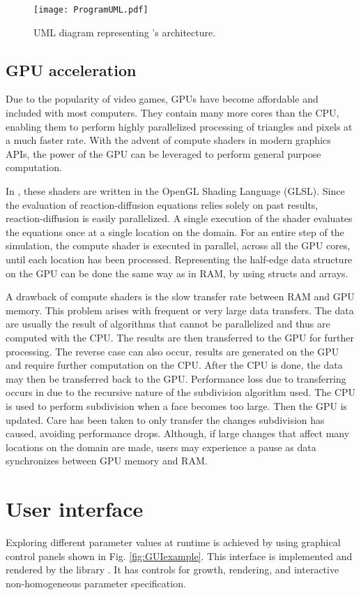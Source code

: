 \begin{figure}[H]
	\centering
	\texttt{[image: ProgramUML.pdf]}
	\caption{UML diagram representing \ProgramName{}'s architecture.}
	\label{fig:umlDiagram}
\end{figure}

\subsection{GPU acceleration}
Due to the popularity of video games, GPUs have become affordable and included with most computers. They contain many more cores than the CPU, enabling them to perform highly parallelized processing of triangles and pixels at a much faster rate. With the advent of compute shaders in modern graphics APIs, the power of the GPU can be leveraged to perform general purpose computation. 

In \ProgramName{}, these shaders are written in the OpenGL Shading Language (GLSL). Since the evaluation of reaction-diffusion equations relies solely on past results, reaction-diffusion is easily parallelized. A single execution of the shader evaluates the equations once at a single location on the domain. For an entire step of the simulation, the compute shader is executed in parallel, across all the GPU cores, until each location has been processed. Representing the half-edge data structure on the GPU can be done the same way as in RAM, by using structs and arrays.

A drawback of compute shaders is the slow transfer rate between RAM and GPU memory. This problem arises with frequent or very large data transfers. The data are usually the result of algorithms that cannot be parallelized and thus are computed with the CPU. The results are then transferred to the GPU for further processing. The reverse case can also occur, results are generated on the GPU and require further computation on the CPU. After the CPU is done, the data may then be transferred back to the GPU. Performance loss due to transferring occurs in \ProgramName{} due to the recursive nature of the subdivision algorithm used. The CPU is used to perform subdivision when a face becomes too large. Then the GPU is updated. Care has been taken to only transfer the changes subdivision has caused, avoiding performance drops. Although, if large changes that affect many locations on the domain are made, users may experience a pause as data synchronizes between GPU memory and RAM. 

\section{User interface}
Exploring different parameter values at runtime is achieved by using graphical control panels shown in Fig. \ref{fig:GUIexample}. This interface is implemented and rendered by the library  \citep{Cornut2019}. It has controls for growth, rendering, and interactive non-homogeneous parameter specification. 

